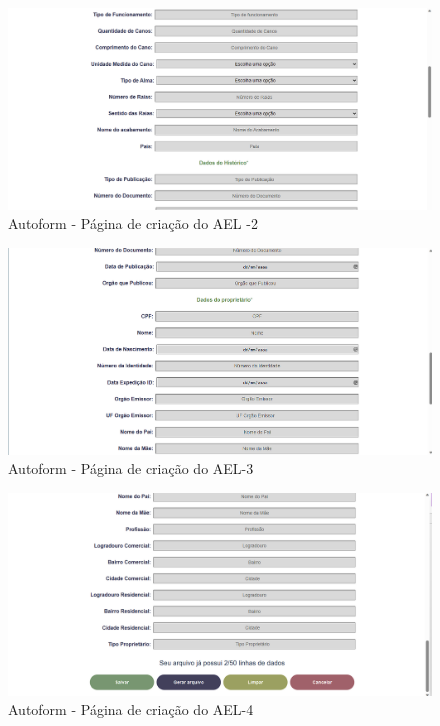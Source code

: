 \begin{figure}[H]
    \caption{\label{fig:tela-ael2}Autoform - Página de criação do AEL -2}
    \begin{center}
        \includegraphics[scale=0.5]{imagens/autoform-ael-gerar2.png}
    \end{center}
\end{figure}
\begin{figure}[H]
    \caption{\label{fig:tela-ael3}Autoform - Página de criação do AEL-3}
    \begin{center}
        \includegraphics[scale=0.5]{imagens/autoform-ael-gerar3.png}
    \end{center}
\end{figure}

\begin{figure}[H]
    \caption{\label{fig:tela-ael4}Autoform - Página de criação do AEL-4}
    \begin{center}
        \includegraphics[scale=0.5]{imagens/autoform-ael-gerar4.png}
    \end{center}
\end{figure}

